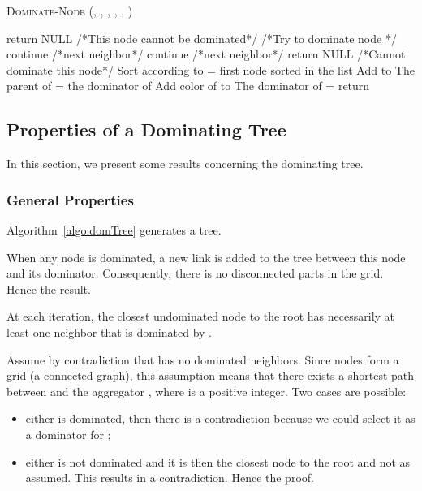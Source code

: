 \begin{algorithm}\caption{\textsc{Dominate-Node} (, ,  , , , )}\label{algo:domNode}
\begin{algorithmic}[1]
\begin{scriptsize}

 \label{algo-line:nodeom1}
\STATE return NULL /*This node cannot be dominated*/ \label{algo-line:nodeom2}
\ENDIF
\STATE /*Try to dominate node  */
	\STATE continue /*next neighbor*/	
	\ENDIF
	\label{line:noDom}
	\STATE continue \label{line:continue}/*next neighbor*/	
    \ELSE 
     \label{line:add}
    \ENDIF 
\ENDFOR 
{}
\STATE return NULL /*Cannot dominate this node*/
\ENDIF 
\STATE Sort  according to 
\STATE  = first node sorted in the list 
\STATE Add  to  \label{line:addT}
\STATE The parent of  = the dominator of 
\STATE Add color of  to 
\STATE The dominator of  = 
\STATE return 
\end{scriptsize}\end{algorithmic}
\end{algorithm}



%
 \newpage
\subsection{Properties of a Dominating Tree}\label{sec:propoDomTree}
In this section, we present some results concerning the dominating tree. 


\subsubsection{General Properties}
\begin{theorem}
Algorithm~\ref{algo:domTree} generates a tree.
\end{theorem}

\proof
When any node is dominated, a new link is added to the tree between this node and its dominator. Consequently, there is no disconnected parts in the grid. Hence the result.
\endproof


\begin{lemma}\label{lemma:domNeigh}
At each iteration, the closest undominated node  to the root  has necessarily at least one neighbor that is dominated by .
\end{lemma}

\proof
Assume by contradiction that  has no dominated neighbors. Since nodes form a grid (a connected graph), this assumption means that there exists a shortest path  between  and the aggregator , where  is a positive integer. 
Two cases are possible: 
\begin{itemize}
\item either  is dominated, then there is a contradiction because we could select it as a dominator for ;
\item  either  is not dominated and it is then the closest node to the root and not  as assumed. This results in a contradiction. Hence the proof.
\end{itemize}



